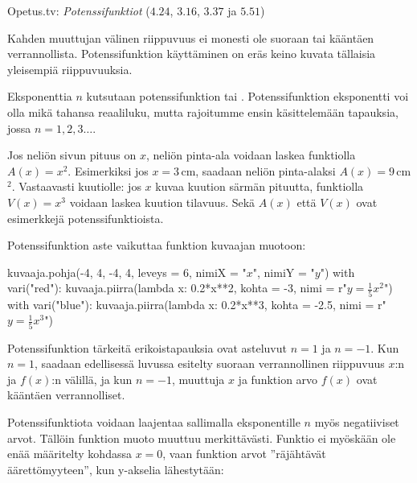 {Opetus.tv: \emph{Potenssifunktiot} ($4.24$, $3.16$, $3.37$ ja $5.51$)}

Kahden muuttujan välinen riippuvuus ei monesti ole suoraan tai kääntäen verrannollista. Potenssifunktion käyttäminen on eräs keino kuvata tällaisia yleisempiä riippuvuuksia.


Eksponenttia $n$ kutsutaan potenssifunktion  tai . Potenssifunktion eksponentti voi olla mikä tahansa reaaliluku, mutta rajoitumme ensin käsittelemään tapauksia, jossa $n = 1, 2, 3\ldots $.

\begin{esimerkki}
Jos neliön sivun pituus on $x$, neliön pinta-ala voidaan laskea funktiolla $A(x)=x^2$. Esimerkiksi jos $x = 3$\,cm, saadaan neliön pinta-alaksi $A(x) = 9$\,cm$^2$. Vastaavasti kuutiolle: jos $x$ kuvaa kuution särmän pituutta, funktiolla $V(x)=x^3$ voidaan laskea kuution tilavuus. Sekä $A(x)$ että $V(x)$ ovat esimerkkejä potenssifunktioista.
\end{esimerkki}

Potenssifunktion aste vaikuttaa funktion kuvaajan muotoon:

\begin{center}
\begin{kuva}
    kuvaaja.pohja(-4, 4, -4, 4, leveys = 6, nimiX = "$x$", nimiY = "$y$")
    with vari("red"): kuvaaja.piirra(lambda x: 0.2*x**2, kohta = -3, nimi = r"$y=\frac{1}{5}x^2$")
    with vari("blue"): kuvaaja.piirra(lambda x: 0.2*x**3, kohta = -2.5, nimi = r"$y=\frac{1}{5}x^3$")
\end{kuva}
\end{center}

Potenssifunktion tärkeitä erikoistapauksia ovat asteluvut $n = 1$ ja $n = -1$. Kun $n = 1$, saadaan edellisessä luvussa esitelty suoraan verrannollinen riippuvuus $x$:n ja $f(x)$:n välillä, ja kun $n = -1$, muuttuja $x$ ja funktion arvo $f(x)$ ovat kääntäen verrannolliset.

Potenssifunktiota voidaan laajentaa sallimalla eksponentille $n$ myös negatiiviset arvot. Tällöin funktion muoto muuttuu merkittävästi. Funktio ei myöskään ole enää määritelty kohdassa $x = 0$, vaan funktion arvot ''räjähtävät äärettömyyteen'', kun y-akselia lähestytään: %

